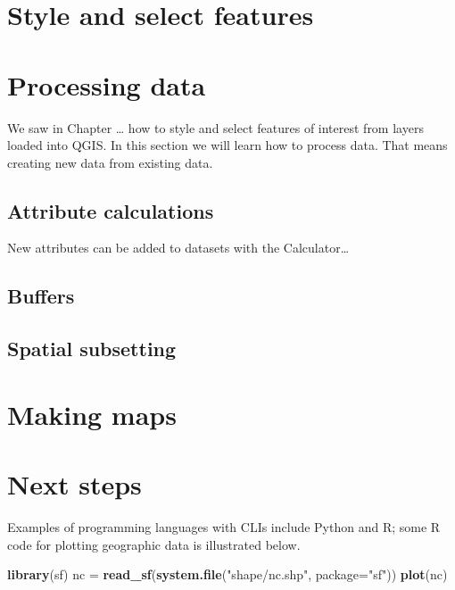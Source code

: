 \documentclass[10pt,a5paper,]{book}
\makeatletter
\newenvironment{Shaded}{\begin{snugshade}}{\end{snugshade}}
\newcommand{\DataTypeTok}[1]{\textcolor[rgb]{0.27,0.27,0.27}{#1}}
\newcommand{\KeywordTok}[1]{\textcolor[rgb]{0.27,0.27,0.27}{\textbf{#1}}}
\newcommand{\NormalTok}[1]{#1}
\newcommand{\StringTok}[1]{\textcolor[rgb]{0.5,0.5,0.5}{#1}}
\newenvironment{kframe}{%
\medskip{}
\setlength{\fboxsep}{.8em}
 \def\at@end@of@kframe{}%
 \ifinner\ifhmode%
  \def\at@end@of@kframe{\end{minipage}}%
  \begin{minipage}{\columnwidth}%
 \fi\fi%
 \def\FrameCommand##1{\hskip\@totalleftmargin \hskip-\fboxsep
 \colorbox{shadecolor}{##1}\hskip-\fboxsep
     \hskip-\linewidth \hskip-\@totalleftmargin \hskip\columnwidth}%
 \MakeFramed {\advance\hsize-\width
   \@totalleftmargin\z@ \linewidth\hsize
   \@setminipage}}%
 {\par\unskip\endMakeFramed%
 \at@end@of@kframe}
\renewenvironment{Shaded}{\begin{kframe}}{\end{kframe}}
\makeatother
\begin{document}
\hypertarget{style-and-select-features}{%
\chapter{Style and select features}\label{style-and-select-features}}

\hypertarget{processing-data}{%
\chapter{Processing data}\label{processing-data}}

We saw in Chapter \ldots{} how to style and select features of interest from layers loaded into QGIS.
In this section we will learn how to process data.
That means creating new data from existing data.

\hypertarget{attribute-calculations}{%
\section{Attribute calculations}\label{attribute-calculations}}

New attributes can be added to datasets with the Calculator\ldots{}

\hypertarget{buffers}{%
\section{Buffers}\label{buffers}}

\hypertarget{spatial-subsetting}{%
\section{Spatial subsetting}\label{spatial-subsetting}}

\hypertarget{making-maps}{%
\chapter{Making maps}\label{making-maps}}

\hypertarget{next-steps}{%
\chapter{Next steps}\label{next-steps}}

Examples of programming languages with CLIs include Python and R; some R
code for plotting geographic data is illustrated below.

\begin{Shaded}
\begin{Highlighting}[]
\KeywordTok{library}\NormalTok{(sf)}
\NormalTok{nc =}\StringTok{ }\KeywordTok{read_sf}\NormalTok{(}\KeywordTok{system.file}\NormalTok{(}\StringTok{"shape/nc.shp"}\NormalTok{, }\DataTypeTok{package=}\StringTok{"sf"}\NormalTok{))}
\KeywordTok{plot}\NormalTok{(nc)}
\end{Highlighting}
\end{Shaded}
\end{document}
